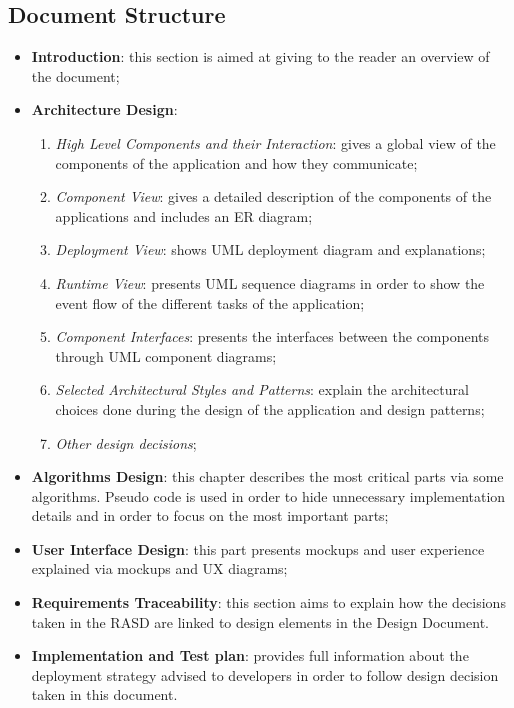 \documentclass[a4paper]{article}
\begin{document}

\subsection{Document Structure}
\begin{itemize}
    \item \textbf{Introduction}: this section is aimed at giving to the reader an overview of the document;

\item \textbf{Architecture Design}:
\begin{enumerate}
    \item \textit{High Level Components and their Interaction}: gives a global view of the components of the application and how they communicate;

    \item \textit{Component View}: gives a detailed description of the components of the applications and includes an ER diagram;

    \item \textit{Deployment View}: shows UML deployment diagram and explanations;

    \item \textit{Runtime View}: presents UML sequence diagrams in order to show the event flow of the different tasks of the application;

    \item \textit{Component Interfaces}: presents the interfaces between the components through UML component diagrams;

    \item \textit{Selected Architectural Styles and Patterns}: explain the architectural choices done during the design of the application and design patterns;

    \item \textit{Other design decisions};
\end{enumerate}

\item \textbf{Algorithms Design}: this chapter describes the most critical parts via some algorithms. Pseudo code is used in order to hide unnecessary implementation details and in order to focus on the most important parts;

\item \textbf{User Interface Design}: this part presents mockups and user experience explained via mockups and UX diagrams;

\item \textbf{Requirements Traceability}: this section aims to explain how the decisions taken in the RASD are linked to design elements in the Design Document.

\item \textbf{Implementation and Test plan}: provides full information about the deployment strategy advised to developers in order to follow design decision taken in this document.
\end{itemize}
\end{document}
